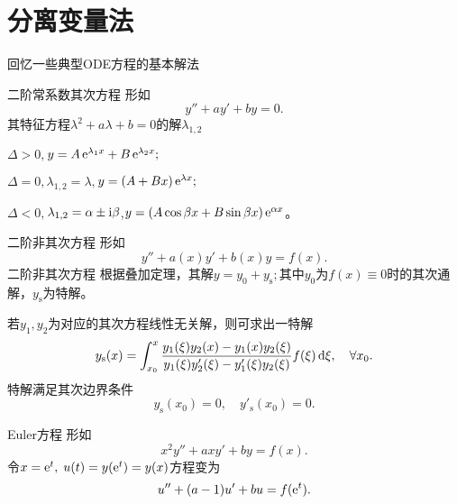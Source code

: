 \chapter{分离变量法}
回忆一些典型ODE方程的基本解法
\begin{method}{二阶常系数其次方程}{}
	形如
	\begin{equation}
		y''+ay'+by=0.
	\end{equation}
	其特征方程$\lambda^2+a\lambda+b=0$的解$\lambda_{1,2}$
	\begin{compactenum}[I.]
		\item $\Delta>0,$\quad$y=A\mathop{}\!\mathrm{e}^{\lambda_1x}+B\mathop{}\!\mathrm{e}^{\lambda_2x};$
		\item $\Delta=0,$\quad$\lambda_{1,2}=\lambda,$\quad$y=(A+Bx)\mathop{}\!\mathrm{e}^{\lambda x};$
		\item $\Delta<0,$\quad$\lambda_{1,2}=\alpha\pm\mathrm{i}\beta$,\quad$y=(A\cos\beta x+B\sin\beta x)\mathop{}\!\mathrm{e}^{\alpha x}$。
	\end{compactenum}
\end{method}
\begin{method}{二阶非其次方程}{}
	形如
	\begin{equation}
		y''+a(x)y'+b(x)y=f(x).
	\end{equation}
	二阶非其次方程
	根据叠加定理，其解$y=y_0+y_\mathrm s;$其中$y_0$为$f(x)\equiv 0$时的其次通解，$y_\mathrm s$为特解。
	
	若$y_1,y_2$为对应的其次方程线性无关解，则可求出一特解
	\begin{align}\label{General to Particular Solution}
		y_\mathrm s(x)=\int_{x_0}^x\frac{y_1(\xi)y_2(x)-y_1(x)y_2(\xi)}{y_1(\xi)y_2'(\xi)-y_1'(\xi)y_2(\xi)}f(\xi)\mathop{}\!\mathrm{d} \xi,\quad\forall x_0.
	\end{align}
	特解满足其次边界条件
	\[
		y_\mathrm s(x_0)=0,\quad y'_\mathrm s(x_0)=0.
	\]
\end{method}
\begin{method}{Euler方程}{}
	形如
	\begin{equation}
		x^2y''+axy'+by=f(x).
	\end{equation}
	令$x=\mathop{}\!\mathrm{e}^ t,\;u(t)=y(\mathop{}\!\mathrm{e}^ t)=y(x)$方程变为
	\begin{align}
		u''+(a-1)u'+bu=f(\mathop{}\!\mathrm{e}^ t).
	\end{align}
\end{method}

